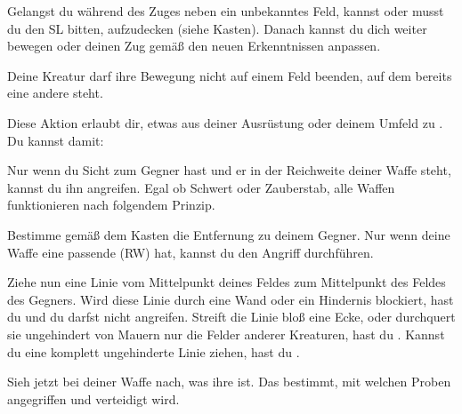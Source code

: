 {			Gelangst du während des Zuges neben ein unbekanntes Feld, kannst oder musst du den SL bitten, aufzudecken (siehe Kasten). Danach kannst du dich weiter bewegen oder deinen Zug gemäß den neuen Erkenntnissen anpassen.

			Deine Kreatur darf ihre Bewegung nicht auf einem Feld beenden, auf dem bereits eine andere steht.

			Diese Aktion erlaubt dir, etwas aus deiner Ausrüstung oder deinem Umfeld zu . Du kannst damit:


			Nur wenn du Sicht zum Gegner hast und er in der Reichweite deiner Waffe steht, kannst du ihn angreifen. Egal ob Schwert oder Zauberstab, alle Waffen funktionieren nach folgendem Prinzip.

			Bestimme gemäß dem Kasten  die Entfernung zu deinem Gegner. Nur wenn deine Waffe eine passende  (RW) hat, kannst du den Angriff durchführen.

			Ziehe nun eine Linie vom Mittelpunkt deines Feldes zum Mittelpunkt des Feldes des Gegners. Wird diese Linie durch eine Wand oder ein Hindernis blockiert, hast du  und du darfst nicht angreifen. Streift die Linie bloß eine Ecke, oder durchquert sie ungehindert von Mauern nur die Felder anderer Kreaturen, hast du . Kannst du eine komplett ungehinderte Linie ziehen, hast du .

			Sieh jetzt bei deiner Waffe nach, was ihre  ist. Das bestimmt, mit welchen Proben angegriffen und verteidigt wird.


}
